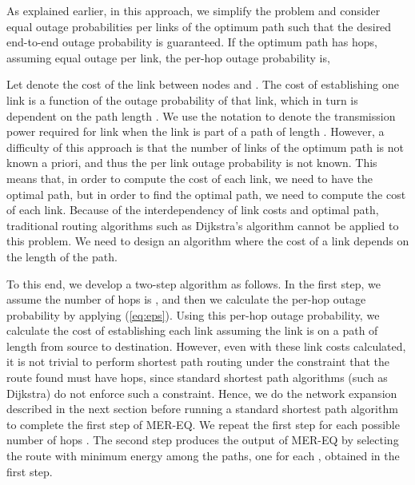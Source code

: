 \documentclass[10pt,journal]{IEEEtran}
\theoremstyle{definition}
\begin{document}
As explained earlier, in this approach,  we simplify the problem and consider equal outage probabilities per links of the optimum path such that the desired end-to-end outage probability  is guaranteed.
If the optimum path has  hops, assuming equal outage per link, the per-hop outage probability is,


 Let  denote the cost of the link between nodes  and . 
The cost of establishing one link is a function of the outage probability of that link, which in turn is dependent on the path length . We use the notation  to denote the transmission power required for link  when the link is part of a path of length .
However, a difficulty of this approach is that the number of links of the optimum path  is not  known a priori, and thus the per link outage probability  is not known.
This means that, in order to compute the cost of each link, we need to have the optimal path, but in order to find the optimal path, we need to compute the cost of each link. 
Because of the interdependency of link costs and optimal path, traditional routing algorithms such as Dijkstra's algorithm cannot be applied to this problem. 
We need to design an algorithm where the cost of a link depends on the length of the path. 

To this end, we develop a two-step algorithm as follows. 
In the first step, we assume the number of hops is , and then we calculate the per-hop outage probability by applying (\ref{eq:eps}).  Using this per-hop outage probability, we calculate the cost of establishing each link assuming the link is on a path of length  from source to destination.  However, even with these link costs calculated, it is not trivial to perform shortest path routing under the constraint that the route found must have  hops, since standard shortest path algorithms (such as Dijkstra) do not enforce such a constraint.  Hence, we do the network expansion described in the next section before running a standard shortest path algorithm to complete the first step of MER-EQ.  We repeat the first step for each possible number of hops .  The second step produces the output of MER-EQ by selecting the route with minimum energy among the  paths, one for each , obtained in the first step.
\end{document}
